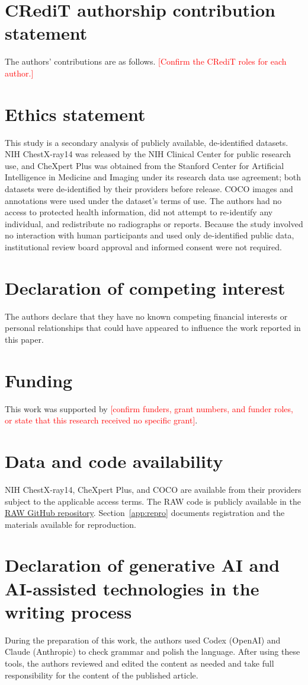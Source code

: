 \section*{CRediT authorship contribution statement}
The authors' contributions are as follows. \textcolor{red}{[Confirm the CRediT roles for each author.]}

\section*{Ethics statement}
This study is a secondary analysis of publicly available, de-identified datasets. NIH ChestX-ray14 was released by the NIH Clinical Center for public research use, and CheXpert Plus was obtained from the Stanford Center for Artificial Intelligence in Medicine and Imaging under its research data use agreement; both datasets were de-identified by their providers before release. COCO images and annotations were used under the dataset's terms of use. The authors had no access to protected health information, did not attempt to re-identify any individual, and redistribute no radiographs or reports. Because the study involved no interaction with human participants and used only de-identified public data, institutional review board approval and informed consent were not required.

\section*{Declaration of competing interest}
The authors declare that they have no known competing financial interests or personal relationships that could have appeared to influence the work reported in this paper.

\section*{Funding}
This work was supported by \textcolor{red}{[confirm funders, grant numbers, and funder roles, or state that this research received no specific grant]}.

\section*{Data and code availability}
NIH ChestX-ray14, CheXpert Plus, and COCO are available from their providers subject to the applicable access terms.\cite{wang2017chestxray,chambon2024chexpertplus,lin2014coco} The RAW code is publicly available in the \href{https://github.com/hq0709/reading-is-not-writing-code}{RAW GitHub repository}. Section~\ref{app:repro} documents registration and the materials available for reproduction.

\section*{Declaration of generative AI and AI-assisted technologies in the writing process}
During the preparation of this work, the authors used Codex (OpenAI) and Claude (Anthropic) to check grammar and polish the language. After using these tools, the authors reviewed and edited the content as needed and take full responsibility for the content of the published article.
